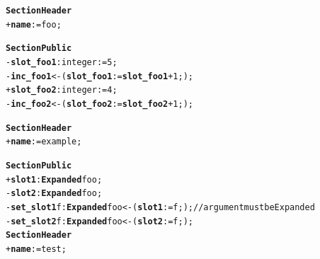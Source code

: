 \documentclass[11pt]{mybook}
\begin{document}
\begin{alltt}
{\bf{}Section Header}
  + {\bf{}name} := {\sc{}foo};

{\bf{}Section Public}
  - {\bf{}slot\_foo1}:{\sc{}integer} := 5;
  - {\bf{}inc\_foo1} <- ( {\bf{}slot\_foo1} := {\bf{}slot\_foo1} + 1; );
  + {\bf{}slot\_foo2}:{\sc{}integer} := 4;\\
  - {\bf{}inc\_foo2} <- ( {\bf{}slot\_foo2} := {\bf{}slot\_foo2} + 1; );

{\bf{}Section Header}
  + {\bf{}name} := {\sc{}example};

{\bf{}Section Public}
  + {\bf{}slot1}:{\bf{}Expanded} {\sc{}foo};
  - {\bf{}slot2}:{\bf{}Expanded} {\sc{}foo};
  - {\bf{}set\_slot1} f:{\bf{}Expanded} {\sc{}foo} <- ( {\bf{}slot1} := f; );   // argument must be Expanded
  - {\bf{}set\_slot2} f:{\bf{}Expanded} {\sc{}foo} <- ( {\bf{}slot2} := f; );\\

{\bf{}Section Header}
  + {\bf{}name} := {\sc{}test};


\end{alltt}
\end{document}
